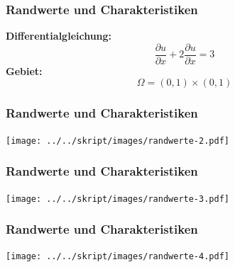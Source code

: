 \documentclass[handout]{beamer}
\begin{document}
\begin{frame}
\frametitle{Randwerte und Charakteristiken}

{\bf Differentialgleichung:}
\[
\frac{\partial u}{\partial x}
+
2\frac{\partial u}{\partial x}
= 3
\]
{\bf Gebiet:}
\[
\Omega = (0,1)\times(0,1)
\]
\end{frame}

\begin{frame}
\frametitle{Randwerte und Charakteristiken}
\begin{center}
\texttt{[image: ../../skript/images/randwerte-2.pdf]}
\end{center}
\end{frame}

\begin{frame}
\frametitle{Randwerte und Charakteristiken}
\begin{center}
\texttt{[image: ../../skript/images/randwerte-3.pdf]}
\end{center}
\end{frame}

\begin{frame}
\frametitle{Randwerte und Charakteristiken}
\begin{center}
\texttt{[image: ../../skript/images/randwerte-4.pdf]}
\end{center}
\end{frame}
\end{document}
